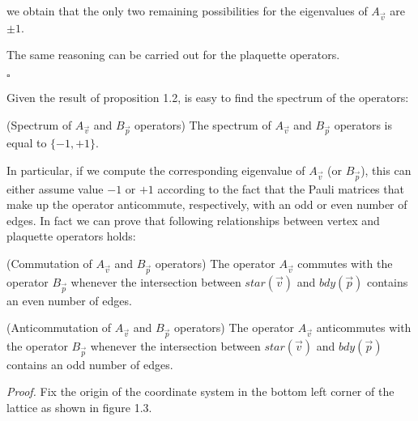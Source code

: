 \documentclass{Configuration_Files/PoliMi3i_thesis}
\begin{document}
we obtain that the only two remaining possibilities for the eigenvalues of $A_{\vec{v}}$ are $\pm 1$. \newline

The same reasoning can be carried out for the plaquette operators.

\hfill $\square$ 

Given the result of proposition 1.2, is easy to find the spectrum of the operators: 

\begin{proposition} (Spectrum of $A_{\vec{v}}$ and $B_{\vec{p}}$ operators) The spectrum of $A_{\vec{v}}$ and $B_{\vec{p}}$ operators is equal to $\{-1,+1\}$. 
\end{proposition}

In particular, if we compute the corresponding eigenvalue of $A_{\vec{v}}$ (or $B_{\vec{p}}$), this can either assume value $-1$ or $+1$ according to the fact that the Pauli matrices that make up the operator anticommute, respectively, with an odd or even number of edges.
In fact we can prove that following relationships between vertex and plaquette operators holds:

\begin{proposition} (Commutation of $A_{\vec{v}}$ and $B_{\vec{p}}$ operators) The operator $A_{\vec{v}}$ commutes with the operator $B_{\vec{p}}$ whenever the intersection between $star(\vec{v})$ and $bdy(\vec{p})$ contains an even number of edges.
\end{proposition}


\begin{proposition} (Anticommutation of $A_{\vec{v}}$ and $B_{\vec{p}}$ operators) The operator $A_{\vec{v}}$ anticommutes with the operator $B_{\vec{p}}$ whenever the intersection between $star(\vec{v})$ and $bdy(\vec{p})$ contains an odd number of edges. 
\end{proposition}


\textit{Proof.}\newline 
Fix the origin of the coordinate system in the bottom left corner of the lattice as shown in figure 1.3. 
\end{document}
